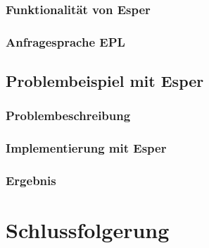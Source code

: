 \documentclass{acm_proc_article-sp}
\begin{document}
\subsubsection{Funktionalität von Esper}
\vspace{0.1cm}
\subsubsection{Anfragesprache EPL}
\vspace{0.1cm}

%
%

\subsection{Problembeispiel mit Esper}
\vspace{0.1cm}
\subsubsection{Problembeschreibung}
\vspace{0.1cm}
\subsubsection{Implementierung mit Esper}
\vspace{0.1cm}
\subsubsection{Ergebnis}
\vspace{0.1cm}


%
%

\section{Schlussfolgerung}
\vspace{0.1cm}


\appendix
\vspace{0.1cm}
%

%
%

\end{document}
